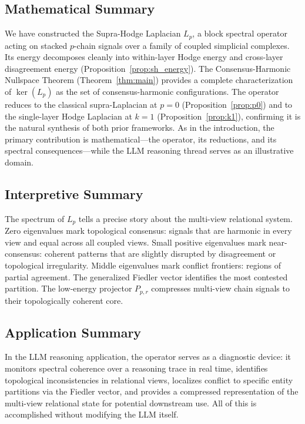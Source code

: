 \documentclass[11pt]{article}
\theoremstyle{definition}
\theoremstyle{remark}
\newcommand{\Pp}{P_{p,r}}
\begin{document}
\subsection{Mathematical Summary}

We have constructed the Supra-Hodge Laplacian $L_p$, a block spectral operator
acting on stacked $p$-chain signals over a family of coupled simplicial
complexes. Its energy decomposes cleanly into within-layer Hodge energy and
cross-layer disagreement energy (Proposition~\ref{prop:sh_energy}). The
Consensus-Harmonic Nullspace Theorem (Theorem~\ref{thm:main}) provides a
complete characterization of $\ker(L_p)$ as the set of consensus-harmonic
configurations. The operator reduces to the classical supra-Laplacian at $p=0$
(Proposition~\ref{prop:p0}) and to the single-layer Hodge Laplacian at $k=1$
(Proposition~\ref{prop:k1}), confirming it is the natural synthesis of both
prior frameworks. As in the introduction, the primary contribution is
mathematical---the operator, its reductions, and its spectral consequences---while
the LLM reasoning thread serves as an illustrative domain.

\subsection{Interpretive Summary}

The spectrum of $L_p$ tells a precise story about the multi-view relational
system. Zero eigenvalues mark topological consensus: signals that are harmonic
in every view and equal across all coupled views. Small positive eigenvalues
mark near-consensus: coherent patterns that are slightly disrupted by
disagreement or topological irregularity. Middle eigenvalues mark conflict
frontiers: regions of partial agreement. The generalized Fiedler vector
identifies the most contested partition. The low-energy projector $\Pp$
compresses multi-view chain signals to their topologically coherent core.

\subsection{Application Summary}

In the LLM reasoning application, the operator serves as a diagnostic device:
it monitors spectral coherence over a reasoning trace in real time, identifies
topological inconsistencies in relational views, localizes conflict to specific
entity partitions via the Fiedler vector, and provides a compressed
representation of the multi-view relational state for potential downstream use.
All of this is accomplished without modifying the LLM itself.
\end{document}
